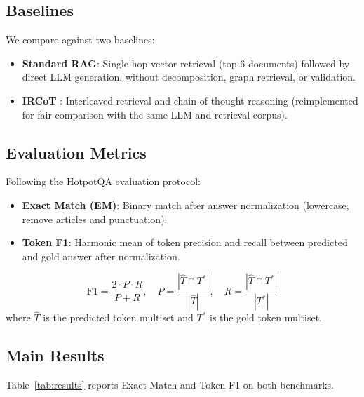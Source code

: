 \documentclass[conference]{IEEEtran}
\begin{document}
\subsection{Baselines}

We compare against two baselines:
\begin{itemize}
  \item \textbf{Standard RAG}: Single-hop vector retrieval (top-6
  documents) followed by direct LLM generation, without decomposition,
  graph retrieval, or validation.
  \item \textbf{IRCoT} \cite{trivedi2023interleaving}: Interleaved
  retrieval and chain-of-thought reasoning (reimplemented for fair
  comparison with the same LLM and retrieval corpus).
\end{itemize}

\subsection{Evaluation Metrics}

Following the HotpotQA evaluation protocol:
\begin{itemize}
  \item \textbf{Exact Match (EM)}: Binary match after answer
  normalization (lowercase, remove articles and punctuation).
  \item \textbf{Token F1}: Harmonic mean of token precision and recall
  between predicted and gold answer after normalization.
\end{itemize}

\begin{equation}
  \text{F1} = \frac{2 \cdot P \cdot R}{P + R}, \quad
  P = \frac{|\hat{T} \cap T^*|}{|\hat{T}|}, \quad
  R = \frac{|\hat{T} \cap T^*|}{|T^*|}
  \label{eq:f1}
\end{equation}
where $\hat{T}$ is the predicted token multiset and $T^*$ is the
gold token multiset.

\subsection{Main Results}

Table~\ref{tab:results} reports Exact Match and Token F1 on both
benchmarks.
\end{document}
